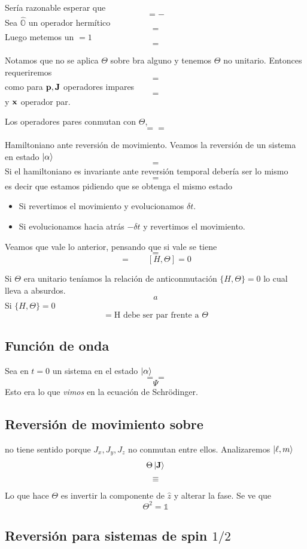 \documentclass[10pt,oneside]{CBFT_book}
\begin{document}
Sería razonable esperar que 
\[
	= -
\]
Sea $\hat{\mathbb{O}}$ un operador hermítico 
\[
	=
\]
Luego metemos un $=1$
\[
	=
\]

Notamos que no se aplica $\Theta$ sobre bra alguno y tenemos $\Theta$ no unitario. Entonces requeriremos 
\[
	=
\]
como para $\vb{p},\vb{J}$ operadores impares 
\[
	=
\]
y $\vb{x}$ operador par.

Los operadores pares conmutan con $\Theta$,
\[
	= =
\]

Hamiltoniano ante reversión de movimiento. Veamos la reversión de un sistema en estado $\Ket{\alpha}$
\[
	=
\]
Si el hamiltoniano es invariante ante reversión temporal debería ser lo mismo 
\[
	=
\]
es decir que estamos pidiendo que se obtenga el mismo estado 
\begin{itemize}
 \item Si revertimos el movimiento y evolucionamos $\delta t$.
 \item Si evolucionamos hacia atrás $-\delta t$ y revertimos el movimiento.
\end{itemize}

Veamos que vale lo anterior, pensando que si vale se tiene 
\[
	=
\]
\[
	=  \qquad [H,\Theta]=0
\]

Si $\Theta$ era unitario teníamos la relación de anticonmutación $\{ H, \Theta \}=0$ lo cual lleva a absurdos.
\[
	a
\]
Si $\{ H,\Theta \} = 0$
\[
	= \text{H debe ser par frente a $\Theta$}
\]

\subsection{Función de onda}

Sea en $t=0$ un sistema en el estado $\Ket{\alpha}$
\[
	= = 
\]
\[
	\Psi
\]
Esto era lo que {\it vimos} en la ecuación de Schrödinger.

\subsection{Reversión de movimiento sobre }


no tiene sentido porque $J_x,J_y,J_z$ no conmutan entre ellos. Analizaremos $\Ket{\ell,m}$
\[
	\Theta \Ket{\vb{J}} 
\]
\[
	\equiv 
\]

Lo que hace $\Theta$ es invertir la componente de $\hat{z}$ y alterar la fase. Se ve que 
\[
	\Theta^2 = \mathbb{1}
\]

\subsection{Reversión para sistemas de spin $1/2$}
\end{document}
